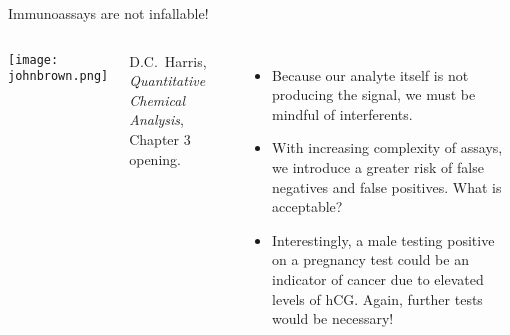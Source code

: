 \documentclass[handout]{beamer}
\begin{document}
%
%
%

\clearpage

\begin{frame}{Immunoassays are not infallable!}
	\begin{columns}
		\begin{center}
			\texttt{[image: johnbrown.png]}

		\end{center}
		\footnotesize{D.C.\ Harris, \textit{Quantitative Chemical
		Analysis}, Chapter 3 opening.}
		\begin{itemize}
			\item Because our analyte itself is not producing the
				signal, we must be mindful of interferents.
			\item With increasing complexity of assays, we introduce
				a greater risk of false negatives and false
				positives. What is acceptable?

				\bigskip

			\item Interestingly, a male testing positive on a
				pregnancy test could be an indicator of cancer
				due to elevated levels of hCG. Again, further
				tests would be necessary!
		\end{itemize}
	\end{columns}
\end{frame}
\end{document}
